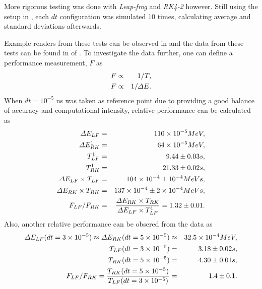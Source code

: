 \documentclass[a4paper,oneside,12pt]{report}
\numberwithin{equation}{chapter}
\begin{document}
More rigorous testing was done with \textit{Leap-frog} and \textit{RK4-2} however. 
Still using the setup in , each $dt$ configuration was simulated 10 times, calculating average and standard deviations afterwards.

Example renders from these tests can be observed in  and
the data from these tests can be found in  of .
To investigate the data further, one can define a performance measurement, $F$ as
\vspace{-10pt}\begin{eqnarray}
    F &\propto& 1/T  , \\
    F &\propto& 1/\Delta E . 
\vspace{-10pt}\end{eqnarray}
When $dt=10^{-5}$ ns was taken as reference point due to providing a good balance of accuracy and computational intensity, 
relative performance can be calculated as
\vspace{-10pt}\begin{eqnarray} \label{eq:f_lf_rk_mag_1}
    \Delta E_{LF} &=& 110 \times 10^{-5} MeV,\\
    \Delta E_{RK}^1 &=& 64 \times 10^{-5} MeV,\\
    T_{LF}^1 &=& 9.44 \pm 0.03 s, \\
    T_{RK}^1 &=& 21.33 \pm 0.02 s, \\
    \Delta E_{LF} \times T_{LF} &=& 104 \times 10^{-4} \pm 10^{-4} MeV s, \\ %
    \Delta E_{RK} \times T_{RK} &=& 137 \times 10^{-4} \pm 2\times 10^{-4}  MeV s, \\ %
    F_{LF}/F_{RK} &=& \frac{\Delta E_{RK} \times T_{RK} }{\Delta E_{LF} \times T_{LF}^1} = 1.32 \pm 0.01 .
\vspace{-10pt}\end{eqnarray}
Also, another relative performance can be obsered from the data as
\vspace{-10pt}\begin{eqnarray} \label{eq:f_lf_rk_mag_2}
    \Delta E_{LF} (dt=3 \times 10^{-5}) \approx \Delta E_{RK} (dt=5 \times 10^{-5}) &\approx& 32.5 \times 10^{-4} MeV, \\
    T_{LF}(dt=3 \times 10^{-5})  &=& 3.18 \pm 0.02 s, \\ %
    T_{RK}(dt=5 \times 10^{-5})  &=& 4.30 \pm 0.01 s, \\ %
    F_{LF}/F_{RK} = \frac{T_{RK}(dt=5 \times 10^{-5})}{T_{LF}(dt=3 \times 10^{-5})} &=& 1.4 \pm 0.1.
\vspace{-10pt}\end{eqnarray}
\end{document}
